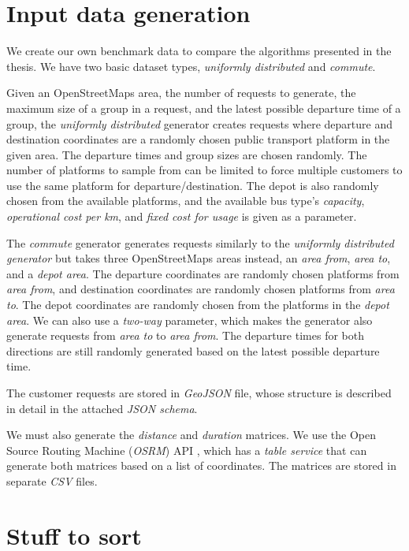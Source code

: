 \section{Input data generation}

We create our own benchmark data to compare the algorithms presented in the thesis. We have two basic dataset types, \textit{uniformly distributed} and \textit{commute}.

Given an OpenStreetMaps area, the number of requests to generate, the maximum size of a group in a request, and the latest possible departure time of a group, the \textit{uniformly distributed} generator creates requests where departure and destination coordinates are a randomly chosen public transport platform in the given area. The departure times and group sizes are chosen randomly. The number of platforms to sample from can be limited to force multiple customers to use the same platform for departure/destination. The depot is also randomly chosen from the available platforms, and the available bus type's \textit{capacity}, \textit{operational cost per km}, and \textit{fixed cost for usage} is given as a parameter.

The \textit{commute} generator generates requests similarly to the \textit{uniformly distributed generator} but takes three OpenStreetMaps areas instead, an \textit{area from}, \textit{area to}, and a \textit{depot area}. The departure coordinates are randomly chosen platforms from \textit{area from}, and destination coordinates are randomly chosen platforms from \textit{area to}. The depot coordinates are randomly chosen from the platforms in the \textit{depot area}. We can also use a \textit{two-way} parameter, which makes the generator also generate requests from \textit{area to} to \textit{area from}. The departure times for both directions are still randomly generated based on the latest possible departure time.

The customer requests are stored in \textit{GeoJSON} file, whose structure is described in detail in the attached \textit{JSON schema}.

We must also generate the \textit{distance} and \textit{duration} matrices. We use the Open Source Routing Machine (\textit{OSRM}) API \cite{luxen-vetter-2011}, which has a \textit{table service} that can generate both matrices based on a list of coordinates. The matrices are stored in separate \textit{CSV} files.

\iffalse

\section{Stuff to sort}

